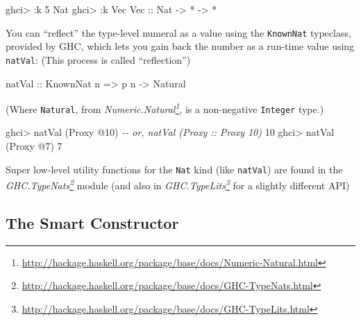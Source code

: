 \documentclass[]{article}
\newenvironment{Shaded}{}{}
\newcommand{\CommentTok}[1]{\textcolor[rgb]{0.38,0.63,0.69}{\textit{#1}}}
\newcommand{\DataTypeTok}[1]{\textcolor[rgb]{0.56,0.13,0.00}{#1}}
\newcommand{\DecValTok}[1]{\textcolor[rgb]{0.25,0.63,0.44}{#1}}
\newcommand{\NormalTok}[1]{#1}
\newcommand{\OperatorTok}[1]{\textcolor[rgb]{0.40,0.40,0.40}{#1}}
\newcommand{\OtherTok}[1]{\textcolor[rgb]{0.00,0.44,0.13}{#1}}
\renewcommand{\href}[2]{#2\footnote{\url{#1}}}
\begin{document}
\begin{Shaded}
\begin{Highlighting}[]
\NormalTok{ghci}\OperatorTok{\textgreater{}} \OperatorTok{:}\NormalTok{k }\DecValTok{5}
\DataTypeTok{Nat}
\NormalTok{ghci}\OperatorTok{\textgreater{}} \OperatorTok{:}\NormalTok{k }\DataTypeTok{Vec}
\DataTypeTok{Vec}\OtherTok{ ::} \DataTypeTok{Nat} \OtherTok{{-}\textgreater{}} \OperatorTok{*} \OtherTok{{-}\textgreater{}} \OperatorTok{*}
\end{Highlighting}
\end{Shaded}

You can ``reflect'' the type-level numeral as a value using the
\texttt{KnownNat} typeclass, provided by GHC, which lets you gain back the
number as a run-time value using \texttt{natVal}: (This process is called
``reflection'')

\begin{Shaded}
\begin{Highlighting}[]
\OtherTok{natVal ::} \DataTypeTok{KnownNat}\NormalTok{ n }\OtherTok{=\textgreater{}}\NormalTok{ p n }\OtherTok{{-}\textgreater{}} \DataTypeTok{Natural}
\end{Highlighting}
\end{Shaded}

(Where \texttt{Natural}, from
\emph{\href{http://hackage.haskell.org/package/base/docs/Numeric-Natural.html}{Numeric.Natural}},
is a non-negative \texttt{Integer} type.)

\begin{Shaded}
\begin{Highlighting}[]
\NormalTok{ghci}\OperatorTok{\textgreater{}}\NormalTok{ natVal (}\DataTypeTok{Proxy} \OperatorTok{@}\DecValTok{10}\NormalTok{)   }\CommentTok{{-}{-} or, natVal (Proxy :: Proxy 10)}
\DecValTok{10}
\NormalTok{ghci}\OperatorTok{\textgreater{}}\NormalTok{ natVal (}\DataTypeTok{Proxy} \OperatorTok{@}\DecValTok{7}\NormalTok{)}
\DecValTok{7}
\end{Highlighting}
\end{Shaded}

Super low-level utility functions for the \texttt{Nat} kind (like
\texttt{natVal}) are found in the
\emph{\href{http://hackage.haskell.org/package/base/docs/GHC-TypeNats.html}{GHC.TypeNats}}
module (and also in
\emph{\href{http://hackage.haskell.org/package/base/docs/GHC-TypeLits.html}{GHC.TypeLits}}
for a slightly different API)

\subsection{The Smart Constructor}\label{the-smart-constructor}
\end{document}
